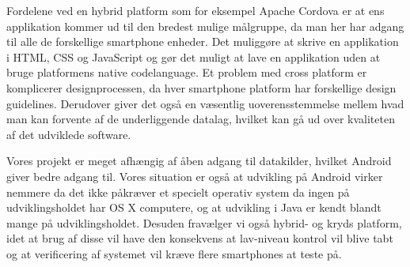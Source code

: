 Fordelene ved en hybrid platform som for eksempel Apache Cordova er at ens applikation kommer ud til den bredest mulige målgruppe, da man her har adgang til alle de forskellige smartphone enheder.
Det muliggøre at skrive en applikation i HTML, CSS og JavaScript og gør det muligt at lave en applikation uden at bruge platformens native codelanguage.
Et problem med cross platform er komplicerer designprocessen, da hver smartphone platform har forskellige design guidelines.
Derudover giver det også en væsentlig uoverensstemmelse mellem hvad man kan forvente af de underliggende datalag, hvilket kan gå ud over kvaliteten af det udviklede software.

Vores projekt er meget afhængig af åben adgang til datakilder, hvilket Android giver bedre adgang til.
Vores situation er også at udvikling på Android virker nemmere da det ikke påkræver et specielt operativ system da ingen på udviklingsholdet har OS X computere, og at udvikling i Java er kendt blandt mange på udviklingsholdet.
Desuden fravælger vi også hybrid- og kryds platform, idet at brug af disse vil have den konsekvens at lav-niveau kontrol vil blive tabt og at verificering af systemet vil kræve flere smartphones at teste på.
